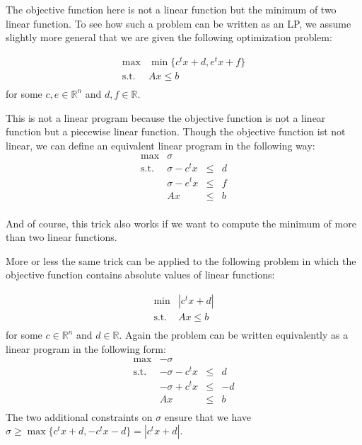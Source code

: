\documentclass[12pt, showidx, twoside]{article}
\def\R{\mathbb{R}}
\begin{document}
{{}

The objective function here is not a linear function but the
minimum of two linear function.
To see how such a problem can be written as an LP, we 
assume slightly more general
that we are given the following optimization problem:


\[
\begin{array}{rc}
 \max &  \min\{c^t x + d, e^t x + f\}   \\
 \mbox{s.t.} & Ax \leq  b\\
\end{array}
\]
for some $c,e \in \R^n$ and $d,f \in \R$. 

This is not a linear program because the objective function 
is not a linear function but a piecewise linear function.
Though the objective function ist not linear,
we can define an equivalent linear program in the following way:
\[
\begin{array}{rrcl}
 \max &  \sigma  \\
  \mbox{s.t.} & \sigma - c^tx & \leq & d \\
              & \sigma - e^tx & \leq & f \\
              & Ax & \leq & b\\
\end{array}
\]


And of course, this trick also works if we want to compute the minimum of
more than two linear functions.

More or less the same trick can be applied to the following problem
in which the
objective function contains absolute values of linear functions:

\[
\begin{array}{rc}
 \min &  |c^t x + d| \\
 \mbox{s.t.} & Ax \leq  b\\
\end{array}
\]
for some $c \in \R^n$ and $d \in \R$. 
Again the problem can
be written equivalently as a linear program in the following form:
\[
\begin{array}{rrcl}
 \max &  -\sigma \\
 \mbox{s.t.}  & -\sigma - c^t x & \leq & d\\
              & -\sigma + c^t x & \leq & -d\\
              & Ax & \leq & b\\
\end{array}
\]
The two additional constraints on $\sigma$ ensure that
we have $\sigma \geq \max\{c^t x + d, -c^t x - d\} = |c^t x + d|$.


}
\end{document}
